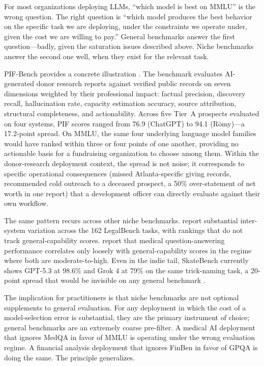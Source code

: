 \documentclass[11pt,a4paper]{article}
\begin{document}
For most organizations deploying LLMs, ``which model is best on MMLU'' is the wrong question. The right question is ``which model produces the best behavior on the specific task we are deploying, under the constraints we operate under, given the cost we are willing to pay.'' General benchmarks answer the first question---badly, given the saturation issues described above. Niche benchmarks answer the second one well, when they exist for the relevant task.

PIF-Bench provides a concrete illustration \citep{lijo2026pifbench}. The benchmark evaluates AI-generated donor research reports against verified public records on seven dimensions weighted by their professional impact: factual precision, discovery recall, hallucination rate, capacity estimation accuracy, source attribution, structural completeness, and actionability. Across five Tier~A prospects evaluated on four systems, PIF scores ranged from 76.9 (ChatGPT) to 94.1 (R\={o}my)---a 17.2-point spread. On MMLU, the same four underlying language model families would have ranked within three or four points of one another, providing no actionable basis for a fundraising organization to choose among them. Within the donor-research deployment context, the spread is not noise; it corresponds to specific operational consequences (missed Atlanta-specific giving records, recommended cold outreach to a deceased prospect, a 50\% over-statement of net worth in one report) that a development officer can directly evaluate against their own workflow.

The same pattern recurs across other niche benchmarks. \citet{guha2024legalbench} report substantial inter-system variation across the 162 LegalBench tasks, with rankings that do not track general-capability scores. \citet{singhal2023large} report that medical question-answering performance correlates only loosely with general-capability scores in the regime where both are moderate-to-high. Even in the indie tail, SkateBench currently shows GPT-5.3 at 98.6\% and Grok 4 at 79\% on the same trick-naming task, a 20-point spread that would be invisible on any general benchmark \citep{browne2025skatebench}.

The implication for practitioners is that niche benchmarks are not optional supplements to general evaluation. For any deployment in which the cost of a model-selection error is substantial, they are the primary instrument of choice; general benchmarks are an extremely coarse pre-filter. A medical AI deployment that ignores MedQA in favor of MMLU is operating under the wrong evaluation regime. A financial analysis deployment that ignores FinBen in favor of GPQA is doing the same. The principle generalizes.
\end{document}
